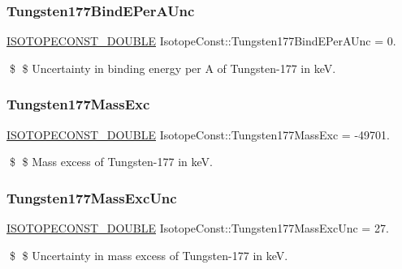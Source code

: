 \subsubsection{\texorpdfstring{Tungsten177\+Bind\+E\+Per\+A\+Unc}{Tungsten177BindEPerAUnc}}
{\footnotesize\ttfamily \mbox{\hyperlink{group___isotope_const-_macros_ga8f45a7272ce02c0b4c65c44636ed719a}{I\+S\+O\+T\+O\+P\+E\+C\+O\+N\+S\+T\+\_\+\+D\+O\+U\+B\+LE}} Isotope\+Const\+::\+Tungsten177\+Bind\+E\+Per\+A\+Unc = 0.}

\$ \$ Uncertainty in binding energy per A of Tungsten-\/177 in keV. \mbox{\label{group___isotope_const-_tungsten-_w177_ga5b14eafe2ca0598552087d398207648f}} 
\subsubsection{\texorpdfstring{Tungsten177\+Mass\+Exc}{Tungsten177MassExc}}
{\footnotesize\ttfamily \mbox{\hyperlink{group___isotope_const-_macros_ga8f45a7272ce02c0b4c65c44636ed719a}{I\+S\+O\+T\+O\+P\+E\+C\+O\+N\+S\+T\+\_\+\+D\+O\+U\+B\+LE}} Isotope\+Const\+::\+Tungsten177\+Mass\+Exc = -\/49701.}

\$ \$ Mass excess of Tungsten-\/177 in keV. \mbox{\label{group___isotope_const-_tungsten-_w177_ga53eb87ae611cd2103a322a70c297e9b5}} 
\subsubsection{\texorpdfstring{Tungsten177\+Mass\+Exc\+Unc}{Tungsten177MassExcUnc}}
{\footnotesize\ttfamily \mbox{\hyperlink{group___isotope_const-_macros_ga8f45a7272ce02c0b4c65c44636ed719a}{I\+S\+O\+T\+O\+P\+E\+C\+O\+N\+S\+T\+\_\+\+D\+O\+U\+B\+LE}} Isotope\+Const\+::\+Tungsten177\+Mass\+Exc\+Unc = 27.}

\$ \$ Uncertainty in mass excess of Tungsten-\/177 in keV. \mbox{\label{group___isotope_const-_tungsten-_w177_gaccff82a9d6416382444a9a5a0a6e96f5}} 
